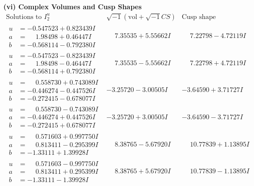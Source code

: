 \documentclass[1p]{elsarticle_modified}
\theoremstyle{definition}
\newcommand{\I}{\sqrt{-1}}
\begin{document}
\newpage\flushleft \textbf{(vi) Complex Volumes and Cusp Shapes}
$$\begin{array}{c|c|c}  
\text{Solutions to }I^u_{2}& \I (\text{vol} + \sqrt{-1}CS) & \text{Cusp shape}\\
 \hline 
\begin{aligned}
u &= -0.547523 + 0.823439 I \\
a &= \phantom{-}1.98498 + 0.46447 I \\
b &= -0.568114 - 0.792380 I\end{aligned}
 & \phantom{-}7.35535 + 5.55662 I & \phantom{-}7.22798 - 4.72119 I \\ \hline\begin{aligned}
u &= -0.547523 - 0.823439 I \\
a &= \phantom{-}1.98498 - 0.46447 I \\
b &= -0.568114 + 0.792380 I\end{aligned}
 & \phantom{-}7.35535 - 5.55662 I & \phantom{-}7.22798 + 4.72119 I \\ \hline\begin{aligned}
u &= \phantom{-}0.558730 + 0.743089 I \\
a &= -0.446274 - 0.447526 I \\
b &= -0.272415 - 0.678077 I\end{aligned}
 & -3.25720 - 3.00505 I & -3.64590 + 3.71727 I \\ \hline\begin{aligned}
u &= \phantom{-}0.558730 - 0.743089 I \\
a &= -0.446274 + 0.447526 I \\
b &= -0.272415 + 0.678077 I\end{aligned}
 & -3.25720 + 3.00505 I & -3.64590 - 3.71727 I \\ \hline\begin{aligned}
u &= \phantom{-}0.571603 + 0.997750 I \\
a &= \phantom{-}0.813411 - 0.295399 I \\
b &= -1.33111 + 1.39928 I\end{aligned}
 & \phantom{-}8.38765 - 5.67920 I & \phantom{-}10.77839 + 1.13895 I \\ \hline\begin{aligned}
u &= \phantom{-}0.571603 - 0.997750 I \\
a &= \phantom{-}0.813411 + 0.295399 I \\
b &= -1.33111 - 1.39928 I\end{aligned}
 & \phantom{-}8.38765 + 5.67920 I & \phantom{-}10.77839 - 1.13895 I \\ \hline\begin{aligned}

\end{aligned}
\end{array}$$
\end{document}
